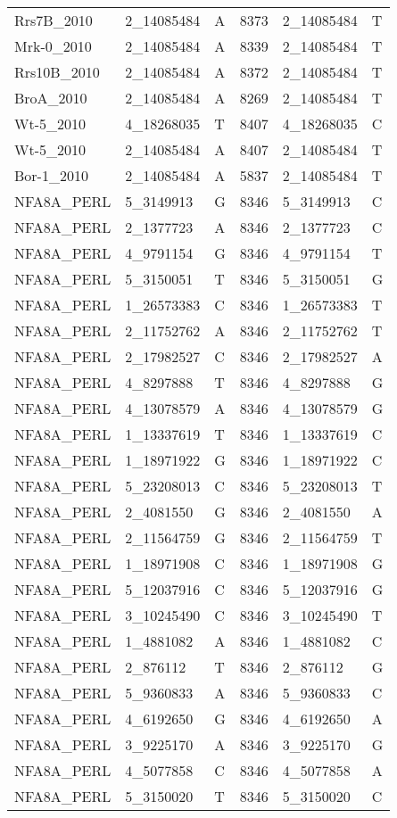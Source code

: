 \begin{center}
\begin{longtable}{|l|l|l|l|l|l|}
Rrs7B\_2010&2\_14085484&A&8373&2\_14085484&T\\
Mrk-0\_2010&2\_14085484&A&8339&2\_14085484&T\\
Rrs10B\_2010&2\_14085484&A&8372&2\_14085484&T\\
BroA\_2010&2\_14085484&A&8269&2\_14085484&T\\
Wt-5\_2010&4\_18268035&T&8407&4\_18268035&C\\
Wt-5\_2010&2\_14085484&A&8407&2\_14085484&T\\
Bor-1\_2010&2\_14085484&A&5837&2\_14085484&T\\
NFA8A\_PERL&5\_3149913&G&8346&5\_3149913&C\\
NFA8A\_PERL&2\_1377723&A&8346&2\_1377723&C\\
NFA8A\_PERL&4\_9791154&G&8346&4\_9791154&T\\
NFA8A\_PERL&5\_3150051&T&8346&5\_3150051&G\\
NFA8A\_PERL&1\_26573383&C&8346&1\_26573383&T\\
NFA8A\_PERL&2\_11752762&A&8346&2\_11752762&T\\
NFA8A\_PERL&2\_17982527&C&8346&2\_17982527&A\\
NFA8A\_PERL&4\_8297888&T&8346&4\_8297888&G\\
NFA8A\_PERL&4\_13078579&A&8346&4\_13078579&G\\
NFA8A\_PERL&1\_13337619&T&8346&1\_13337619&C\\
NFA8A\_PERL&1\_18971922&G&8346&1\_18971922&C\\
NFA8A\_PERL&5\_23208013&C&8346&5\_23208013&T\\
NFA8A\_PERL&2\_4081550&G&8346&2\_4081550&A\\
NFA8A\_PERL&2\_11564759&G&8346&2\_11564759&T\\
NFA8A\_PERL&1\_18971908&C&8346&1\_18971908&G\\
NFA8A\_PERL&5\_12037916&C&8346&5\_12037916&G\\
NFA8A\_PERL&3\_10245490&C&8346&3\_10245490&T\\
NFA8A\_PERL&1\_4881082&A&8346&1\_4881082&C\\
NFA8A\_PERL&2\_876112&T&8346&2\_876112&G\\
NFA8A\_PERL&5\_9360833&A&8346&5\_9360833&C\\
NFA8A\_PERL&4\_6192650&G&8346&4\_6192650&A\\
NFA8A\_PERL&3\_9225170&A&8346&3\_9225170&G\\
NFA8A\_PERL&4\_5077858&C&8346&4\_5077858&A\\
NFA8A\_PERL&5\_3150020&T&8346&5\_3150020&C\\

\end{longtable}
\end{center}
